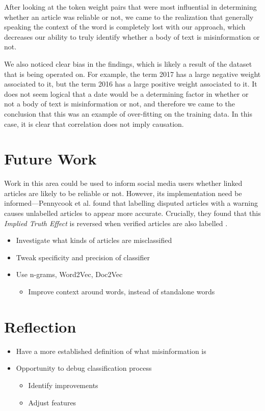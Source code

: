 \documentclass[12pt]{article}
\begin{document}
	\break

    After looking at the token weight pairs that were most influential in determining whether an article was reliable or not, we came to the realization that generally speaking the context of the word is completely lost with our approach, which decreases our ability to truly identify whether a body of text is misinformation or not.

    We also noticed clear bias in the findings, which is likely a result of the dataset that is being operated on. For example, the term 2017 has a large negative weight associated to it, but the term 2016 has a large positive weight associated to it. It does not seem logical that a date would be a determining factor in whether or not a body of text is misinformation or not, and therefore we came to the conclusion that this was an example of over-fitting on the training data. In this case, it is clear that correlation does not imply causation.

	\section{Future Work}

	Work in this area could be used to inform social media users whether linked articles are likely to be reliable or not. However, its implementation need be informed---Pennycook et al. found that labelling disputed articles with a warning causes unlabelled articles to appear more accurate. Crucially, they found that this \textit{Implied Truth Effect} is reversed when verified articles are also labelled \cite{pennycook}.

	\begin{itemize}
		\item Investigate what kinds of articles are misclassified
		\item Tweak specificity and precision of classifier
		\item Use n-grams, Word2Vec, Doc2Vec
		\begin{itemize}
			\item Improve context around words, instead of standalone words
		\end{itemize}
	\end{itemize}

	\section{Reflection}

	\begin{itemize}
		\item Have a more established definition of what misinformation is
		\item Opportunity to debug classification process
		\begin{itemize}
			\item Identify improvements
			\item Adjust features
		\end{itemize}
	\end{itemize}

	
	
\end{document}
